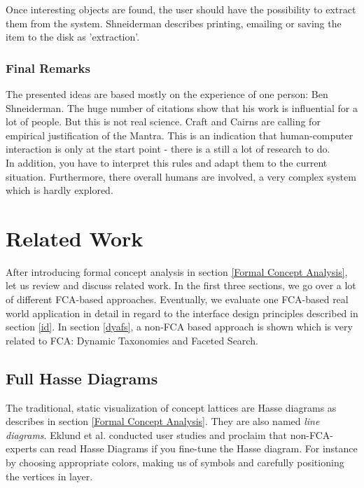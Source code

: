 \documentclass[11pt]{report}
\begin{document}
Once interesting objects are found, the user should have the possibility to extract them from the system. Shneiderman describes printing, emailing or saving the item to the disk as 'extraction'.

\subsection{Final Remarks}

The presented ideas are based mostly on the experience of one person: Ben Shneiderman. The huge number of citations show that his work is influential for a lot of people. But this is not real science. Craft and Cairns \cite{Craft2005} are calling for empirical justification of the Mantra. This is an indication that human-computer interaction is only at the start point - there is a still a lot of research to do. \\

In addition, you have to interpret this rules and adapt them to the current situation. Furthermore, there overall humans are involved, a very complex system which is hardly explored.

\chapter{Related Work} \label{Related Work}

After introducing formal concept analysis in section \ref{Formal Concept Analysis}, let us review and discuss related work. In the first three sections, we go over a lot of different FCA-based approaches. Eventually, we evaluate one FCA-based real world application in detail in regard to the interface design principles described in section \ref{id}. In section \ref{dyafs}, a non-FCA based approach is shown which is very related to FCA: Dynamic Taxonomies and Faceted Search. \\

\section{Full Hasse Diagrams}

The traditional, static visualization of concept lattices are Hasse diagrams as describes in section \ref{Formal Concept Analysis}. They are also named \textit{line diagrams}. Eklund et al. \cite{Eklund2004} conducted user studies and proclaim that non-FCA-experts can read Hasse Diagrams if you fine-tune the Hasse diagram. For instance by choosing appropriate colors, making us of symbols and carefully positioning the vertices in layer. \\
\end{document}
